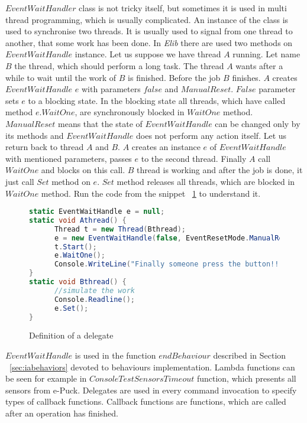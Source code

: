 	$EventWaitHandler$ class is not tricky itself, but sometimes it is used in multi thread programming, which is usually complicated.
	An instance of the class is used to synchronise two threads. It is usually used to signal from one thread to another, 
	that some work has been done. In {\it Elib} there are used two methods on $EventWaitHandle$ instance.
	Let us suppose we have thread $A$ running. Let name $B$ the thread, which should perform a long task. 
	The thread $A$ wants after a while to wait until the work of $B$ is finished.
	Before the job $B$ finishes. $A$ creates $EventWaitHandle$ $e$ with parameters $false$ and $ManualReset$. 
	$False$ parameter sets $e$ to a blocking state. In the blocking state all threads, which have called method $e.WaitOne$, 
	are synchronously blocked in $WaitOne$ method. $ManualReset$ means that the state of $EventWaitHandle$ 
	can be changed only by its methods and $EventWaitHandle$ does not perform any action itself.
	Let us return back to thread $A$ and $B$. $A$ creates an instance $e$ of $EventWaitHandle$ with mentioned parameters, 
	passes $e$ to the second thread. 
	Finally $A$ call $WaitOne$ and blocks on this call.
	$B$ thread is working and after the job is done, it just call $Set$ method on $e$. 
	$Set$ method releases all threads, which are blocked in $WaitOne$ method.
	Run the code from the snippet ~\ref{ewh} to understand it.

		
\begin{figure}[!hbp]
\begin{lstlisting}[language=cs]
static EventWaitHandle e = null;
static void Athread() {
      Thread t = new Thread(Bthread);
      e = new EventWaitHandle(false, EventResetMode.ManualReset);
      t.Start();
      e.WaitOne();
      Console.WriteLine("Finally someone press the button!!!");
}
static void Bthread() {
      //simulate the work      
      Console.Readline();
      e.Set();
}
\end{lstlisting}
\caption{Definition of a delegate} \label{ewh}
\end{figure}

	 $EventWaitHandle$ is used in the function $endBehaviour$ described in Section ~\ref{sec:iabehaviors} 
	 devoted to behaviours implementation.
	 Lambda functions can be seen for example in $ConsoleTestSensorsTimeout$ function, which presents all sensors from e-Puck.
	 Delegates are used in every command invocation to specify types of callback functions.
	 Callback functions are functions, which are called after an operation has finished.
	
